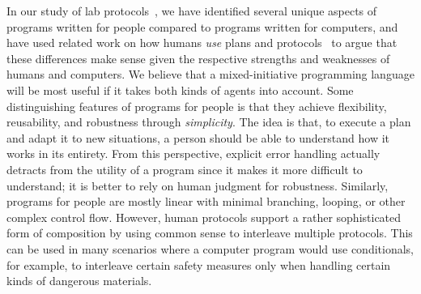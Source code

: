 \documentclass{sig-alternate-05-2015}
\begin{document}
In our study of lab protocols~\cite{ABW15prog}, we have identified several
unique aspects of programs written for people compared to programs written for
computers, and have used related work on how humans \emph{use} plans and
protocols~\cite{S87plans,L02protocols} to argue that these differences make
sense given the respective strengths and weaknesses of humans and computers.
%
We believe that a mixed-initiative programming language will be most useful if
it takes both kinds of agents into account.
%
Some distinguishing features of programs for people is that they achieve
flexibility, reusability, and robustness through \emph{simplicity}. The idea is
that, to execute a plan and adapt it to new situations, a person should be able
to understand how it works in its entirety. From this perspective, explicit
error handling actually detracts from the utility of a program since it makes
it more difficult to understand; it is better to rely on human judgment for
robustness. Similarly, programs for people are mostly linear with minimal
branching, looping, or other complex control flow.
%
However, human protocols support a rather sophisticated form of composition by
using common sense to interleave multiple protocols. This can be used in many
scenarios where a computer program would use conditionals, for example, to
interleave certain safety measures only when handling certain kinds of
dangerous materials.


\end{document}
